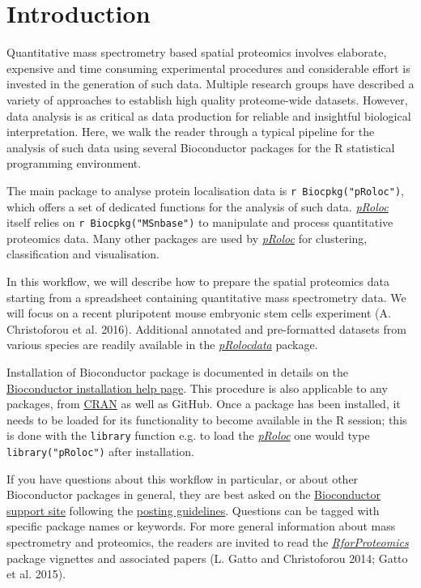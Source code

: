 \section{Introduction}\label{introduction}

Quantitative mass spectrometry based spatial proteomics involves
elaborate, expensive and time consuming experimental procedures and
considerable effort is invested in the generation of such data. Multiple
research groups have described a variety of approaches to establish high
quality proteome-wide datasets. However, data analysis is as critical as
data production for reliable and insightful biological interpretation.
Here, we walk the reader through a typical pipeline for the analysis of
such data using several Bioconductor packages for the R statistical
programming environment.

The main package to analyse protein localisation data is
\texttt{r Biocpkg("pRoloc")}, which offers a set of dedicated functions
for the analysis of such data.
\emph{\href{http://bioconductor.org/packages/pRoloc}{pRoloc}} itself
relies on \texttt{r Biocpkg("MSnbase")} to manipulate and process
quantitative proteomics data. Many other packages are used by
\emph{\href{http://bioconductor.org/packages/pRoloc}{pRoloc}} for
clustering, classification and visualisation.

In this workflow, we will describe how to prepare the spatial proteomics
data starting from a spreadsheet containing quantitative mass
spectrometry data. We will focus on a recent pluripotent mouse embryonic
stem cells experiment (A. Christoforou et al. 2016). Additional
annotated and pre-formatted datasets from various species are readily
available in the
\emph{\href{http://bioconductor.org/packages/pRolocdata}{pRolocdata}}
package.

Installation of Bioconductor package is documented in details on the
\href{http://bioconductor.org/install/\#install-bioconductor-packages}{Bioconductor
installation help page}. This procedure is also applicable to any
packages, from \href{https://cran.r-project.org/}{CRAN} as well as
GitHub. Once a package has been installed, it needs to be loaded for its
functionality to become available in the R session; this is done with
the \texttt{library} function e.g. to load the
\emph{\href{http://bioconductor.org/packages/pRoloc}{pRoloc}} one would
type \texttt{library("pRoloc")} after installation.

If you have questions about this workflow in particular, or about other
Bioconductor packages in general, they are best asked on the
\href{https://support.bioconductor.org/}{Bioconductor support site}
following the
\href{http://www.bioconductor.org/help/support/posting-guide/}{posting
guidelines}. Questions can be tagged with specific package names or
keywords. For more general information about mass spectrometry and
proteomics, the readers are invited to read the
\emph{\href{http://bioconductor.org/packages/RforProteomics}{RforProteomics}}
package vignettes and associated papers (L. Gatto and Christoforou 2014;
Gatto et al. 2015).

